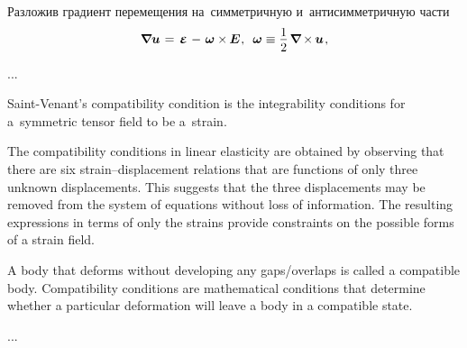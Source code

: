 \begin{otherlanguage}{russian}
Разложив градиент перемещения на~симметричную и~антисимметричную части
\nopagebreak\vspace{.1em}\begin{equation}
\boldnabla \bm{u} \hspace{.2ex} = \tikzmark{beginSymmNablaU} \hspace{0.32ex} \mathboldepsilon \hspace{0.4ex} \tikzmark{endSymmNablaU} \hspace{-0.16ex} - \hspace{.25ex} \tikzmark{beginAsymmNablaU} \bm{\omega} \times \hspace{-0.12ex} \bm{E} \tikzmark{endAsymmNablaU} \hspace{.1ex} , \:\;
\bm{\omega} \equiv \displaystyle \onehalf \hspace{.32ex} \boldnabla \hspace{-0.12ex} \times \hspace{-0.12ex} \bm{u} \hspace{.2ex},
\end{equation}%
%

...

{\small
Saint\hbox{-}Venant’s compatibility condition is the integrability conditions for a~symmetric tensor field to be a~strain.

The compatibility conditions in linear elasticity are obtained by observing that there are six strain\hbox{--}displacement relations that are functions of only three unknown displacements. This suggests that the three displacements may be removed from the system of equations without loss of information. The resulting expressions in terms of only the strains provide constraints on the possible forms of a strain field.

A body that deforms without developing any gaps/overlaps is called a compatible body. Compatibility conditions are mathematical conditions that determine whether a particular deformation will leave a body in a compatible state.
\par}

...


\end{otherlanguage}
